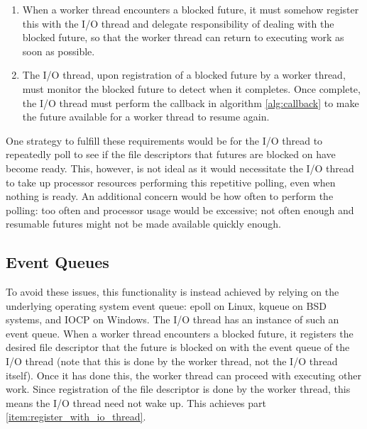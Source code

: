 \documentclass[bsc,frontabs,singlespacing,parskip,deptreport,normalheadings]{infthesis}
\begin{document}
\begin{enumerate}
    \item \label{item:register_with_io_thread} When a worker thread encounters a
        blocked future, it must somehow register this with the I/O thread and
        delegate responsibility of dealing with the blocked future, so that the
        worker thread can return to executing work as soon as possible.
    \item \label{item:monitor_future} The I/O thread, upon registration of a
        blocked future by a worker thread, must monitor the blocked future to
        detect when it completes. Once complete, the I/O thread must perform the
        callback in algorithm \ref{alg:callback} to make the future available
        for a worker thread to resume again.
\end{enumerate}

One strategy to fulfill these requirements would be for the I/O thread to
repeatedly poll to see if the file descriptors that futures are blocked on have
become ready. This, however, is not ideal as it would necessitate the I/O thread
to take up processor resources performing this repetitive polling, even when
nothing is ready. An additional concern would be how often to perform the
polling: too often and processor usage would be excessive; not often enough and
resumable futures might not be made available quickly enough.

\subsection{Event Queues}
\label{subsection:event_queues}

To avoid these issues, this functionality is instead achieved by relying on the
underlying operating system event queue: epoll on Linux, kqueue on BSD systems,
and IOCP on Windows. The I/O thread has an instance of such an event queue. When
a worker thread encounters a blocked future, it registers the desired file
descriptor that the future is blocked on with the event queue of the I/O thread
(note that this is done by the worker thread, not the I/O thread itself). Once
it has done this, the worker thread can proceed with executing other work. Since
registration of the file descriptor is done by the worker thread, this means the
I/O thread need not wake up. This achieves part
\ref{item:register_with_io_thread}.
\end{document}
